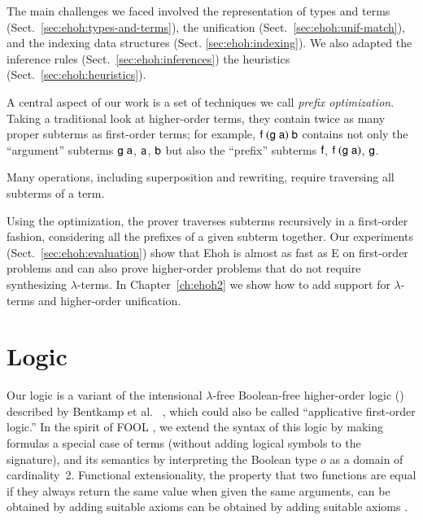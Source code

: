 The main challenges we faced involved the
representation of types and terms
(Sect.~\ref{sec:ehoh:types-and-terms}), the unification
(Sect.~\ref{sec:ehoh:unif-match}), and the indexing data structures
(Sect. \ref{sec:ehoh:indexing}). We also adapted the
inference rules (Sect.~\ref{sec:ehoh:inferences}) the
heuristics (Sect.~\ref{sec:ehoh:heuristics}).

A central aspect of our work is a set of techniques we call
\emph{prefix optimization}. Taking a traditional look at higher-order terms, they contain twice as many proper
subterms as first-order terms; for example,
$\mathsf{f}\;(\mathsf{g}\;\mathsf{a})\;\mathsf{b}$ contains not only the ``argument'' subterms
$\mathsf{g}\;\mathsf{a}$, $\mathsf{a}$, $\mathsf{b}$ but also the ``prefix'' subterms
$\mathsf{f}$, $\mathsf{f}\;(\mathsf{g}\;\mathsf{a})$, $\mathsf{g}$.
\begin{rep}Many operations, including superposition and rewriting, require
traversing all subterms of a term.\end{rep}
Using the optimization, the prover traverses subterms recursively in a
first-order fashion, considering all the prefixes of a given subterm
together. %
%
Our experiments (Sect.~\ref{sec:ehoh:evaluation}) show that Ehoh is
almost as fast as E on first-order problems and can also prove
higher-order problems that do not require synthesizing
$\lambda$-terms. In Chapter~\ref{ch:ehoh2} we show how to add support for
$\lambda$-terms and higher-order unification.

\section{Logic}
\label{sec:ehoh:logic}

Our logic is a variant of the intensional $\lambda$-free Boolean-free
higher-order logic (\lfhol{}) described by Bentkamp et al.\
\cite[Sect.~2]{bbcw-21-lfho}, which could also be called ``applicative
first-order logic.'' In the spirit of FOOL \cite{kotelnikov-16-fool}, we
extend the syntax of this logic by making formulas a special case of terms (without adding logical symbols to the signature),
and its semantics by interpreting the Boolean type $o$ as a domain of
cardinality~2. Functional extensionality, the property that two functions are equal if they
always return the same value when given the same arguments, can be obtained by
adding suitable axioms can be obtained by adding suitable axioms
\cite[Sect.~3.1]{bbcw-21-lfho}.

